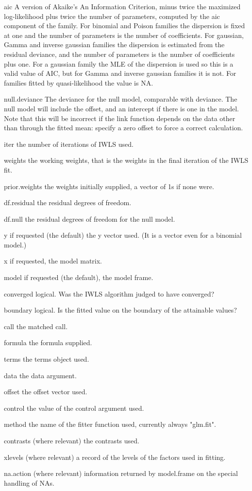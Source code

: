 aic A version of Akaike's An Information Criterion, minus twice the maximized log-likelihood plus twice the number of parameters, computed by the aic component of the family. For binomial and Poison families the dispersion is fixed at one and the number of parameters is the number of coefficients. For gaussian, Gamma and inverse gaussian families the dispersion is estimated from the residual deviance, and the number of parameters is the number of coefficients plus one. For a gaussian family the MLE of the dispersion is used so this is a valid value of AIC, but for Gamma and inverse gaussian families it is not. For families fitted by quasi-likelihood the value is NA.
 
null.deviance The deviance for the null model, comparable with deviance. The null model will include the offset, and an intercept if there is one in the model. Note that this will be incorrect if the link function depends on the data other than through the fitted mean: specify a zero offset to force a correct calculation.
 
iter the number of iterations of IWLS used.
 
weights the working weights, that is the weights in the final iteration of the IWLS fit.
 
prior.weights the weights initially supplied, a vector of 1s if none were.
 
df.residual the residual degrees of freedom.
 
df.null the residual degrees of freedom for the null model.
 
y if requested (the default) the y vector used. (It is a vector even for a binomial model.)
 
x if requested, the model matrix.
 
model if requested (the default), the model frame.
 
converged logical. Was the IWLS algorithm judged to have converged?
 
boundary logical. Is the fitted value on the boundary of the attainable values?
 
call the matched call.
 
formula the formula supplied.
 
terms the terms object used.
 
data the data argument.
 
offset the offset vector used.
 
control the value of the control argument used.
 
method the name of the fitter function used, currently always "glm.fit".
 
contrasts (where relevant) the contrasts used.
 
xlevels (where relevant) a record of the levels of the factors used in fitting.
 
na.action (where relevant) information returned by model.frame on the special handling of NAs.
 
